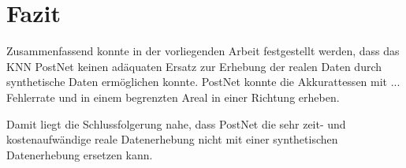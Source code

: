 
\section{Fazit}
\label{sec:kapitel_6}
Zusammenfassend konnte in der vorliegenden Arbeit festgestellt werden, dass das KNN PostNet keinen adäquaten Ersatz zur Erhebung der realen Daten durch synthetische Daten ermöglichen konnte. PostNet konnte die Akkurattessen mit ... Fehlerrate und in einem begrenzten Areal in einer Richtung erheben.

Damit liegt die Schlussfolgerung nahe, dass PostNet die sehr zeit- und kostenaufwändige reale Datenerhebung nicht mit einer synthetischen Datenerhebung ersetzen kann.
